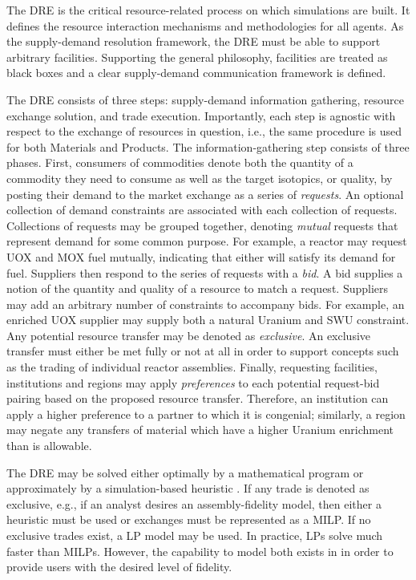 The \gls{DRE} is the critical resource-related process on which \Cyclus
simulations are built. It defines the resource interaction mechanisms and
methodologies for all agents. As the \Cyclus supply-demand resolution framework,
the DRE must be able to support arbitrary facilities. Supporting the general
\Cyclus philosophy, facilities are treated as black boxes and a clear
supply-demand communication framework is defined.

The \gls{DRE} consists of three steps: supply-demand information gathering,
resource exchange solution, and trade execution. Importantly, each step is
agnostic with respect to the exchange of resources in question, i.e., the same
procedure is used for both Materials and Products. The information-gathering
step consists of three phases. First, consumers of commodities denote both the
quantity of a commodity they need to consume as well as the target isotopics, or
quality, by posting their demand to the market exchange as a series of
\textit{requests}. An optional collection of demand constraints are associated
with each collection of requests. Collections of requests may be grouped
together, denoting \textit{mutual} requests that represent demand for some
common purpose. For example, a reactor may request UOX and MOX fuel mutually,
indicating that either will satisfy its demand for fuel. Suppliers then respond
to the series of requests with a \textit{bid}. A bid supplies a notion of the
quantity and quality of a resource to match a request. Suppliers may add an
arbitrary number of constraints to accompany bids. For example, an enriched UOX
supplier may supply both a natural Uranium and SWU constraint. Any potential
resource transfer may be denoted as \textit{exclusive}. An exclusive transfer
must either be met fully or not at all in order to support concepts such as the
trading of individual reactor assemblies. Finally, requesting facilities,
institutions and regions may apply \textit{preferences} to each potential
request-bid pairing based on the proposed resource transfer. Therefore, an
institution can apply a higher preference to a partner to which it is congenial;
similarly, a region may negate any transfers of material which have a higher
Uranium enrichment than is allowable.

The \gls{DRE} may be solved either optimally by a mathematical program or
approximately by a simulation-based heuristic \cite{Gidden2014}. If any trade is
denoted as exclusive, e.g., if an analyst desires an assembly-fidelity model,
then either a heuristic must be used or exchanges must be represented as a
\gls{MILP}. If no exclusive trades exist, a \gls{LP} model may be used. In
practice, LPs solve much faster than \gls{MILP}s. However, the capability to
model both exists in \Cyclus in order to provide users with the desired level of
fidelity.

